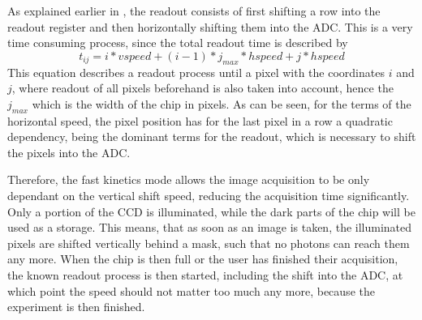 As explained earlier in , the readout consists of first shifting a row into the readout register and then horizontally shifting them into the ADC. This is a very time consuming process, since the total readout time is described by
\begin{equation}
t_{ij} = i*vspeed + (i-1)*j_{max}*hspeed+j*hspeed
\end{equation}
This equation describes a readout process until a pixel with the coordinates $i$ and $j$, where readout of all pixels beforehand is also taken into account, hence the $j_{max}$ which is the width of the chip in pixels.
As can be seen, for the terms of the horizontal speed, the pixel position has for the last pixel in a row a quadratic dependency, being the dominant terms for the readout, which is necessary to shift the pixels into the ADC.

Therefore, the fast kinetics mode allows the image acquisition to be only dependant on the vertical shift speed, reducing the acquisition time significantly. Only a portion of the CCD is illuminated, while the dark parts of the chip will be used as a storage. This means, that as soon as an image is taken, the illuminated pixels are shifted vertically behind a mask, such that no photons can reach them any more. When the chip is then full or the user has finished their acquisition, the known readout process is then started, including the shift into the ADC, at which point the speed should not matter too much any more, because the experiment is then finished.


